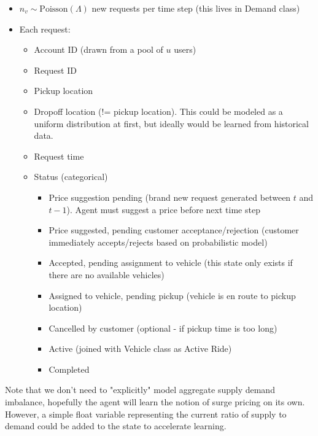 \documentclass[12pt]{article}
\begin{document}
\begin{itemize}
		\item $n_v \sim \mathrm{Poisson}(\Lambda)$ new requests per time step (this lives in Demand class)
		\item Each request:
				\begin{itemize}
						\item Account ID (drawn from a pool of $u$ users)
						\item Request ID
						\item Pickup location
						\item Dropoff location (!= pickup location). This could be modeled as a uniform
								distribution at first, but ideally would be learned from historical data.
						\item Request time
						\item Status (categorical)
								\begin{itemize}
										\item Price suggestion pending (brand new request generated between $t$ and
												$t-1$). Agent must suggest a price before next time step
										\item Price suggested, pending customer acceptance/rejection (customer
												immediately accepts/rejects based on probabilistic model)
										\item Accepted, pending assignment to vehicle (this state only exists if there
												are no available vehicles)
										\item Assigned to vehicle, pending pickup (vehicle is en route to pickup location)
										\item Cancelled by customer (optional - if pickup time is too long)
										\item Active (joined with Vehicle class as Active Ride)
										\item Completed
								\end{itemize}
				\end{itemize}
\end{itemize}
Note that we don't need to "explicitly" model aggregate supply demand imbalance,
hopefully the agent will learn
the notion of surge pricing on its own. However, a simple float variable representing the
current ratio
of supply to demand could be added to the state to accelerate learning.
\end{document}
